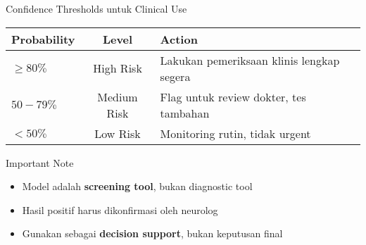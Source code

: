 \documentclass[aspectratio=169]{beamer}
\begin{document}
\begin{frame}{Confidence Thresholds untuk Clinical Use}
\begin{table}
\centering
\begin{tabular}{lcp{5cm}}
\toprule
\textbf{Probability} & \textbf{Level} & \textbf{Action} \\
\midrule
\rowcolor{darkred!20}
$\geq 80\%$ & High Risk & Lakukan pemeriksaan klinis lengkap segera \\
\rowcolor{orange!20}
$50-79\%$ & Medium Risk & Flag untuk review dokter, tes tambahan \\
\rowcolor{darkgreen!20}
$< 50\%$ & Low Risk & Monitoring rutin, tidak urgent \\
\bottomrule
\end{tabular}
\end{table}

\vspace{0.5cm}
\begin{alertblock}{Important Note}
\begin{itemize}
    \item Model adalah \textbf{screening tool}, bukan diagnostic tool
    \item Hasil positif harus dikonfirmasi oleh neurolog
    \item Gunakan sebagai \textbf{decision support}, bukan keputusan final
\end{itemize}
\end{alertblock}
\end{frame}
\end{document}
